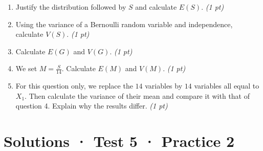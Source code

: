 \begin{enumerate}

\item Justify the distribution followed by $S$ and calculate $E(S)$. \hfill\textit{(1 pt)}

\item Using the variance of a Bernoulli random variable and independence, calculate $V(S)$. \hfill\textit{(1 pt)}

\item Calculate $E(G)$ and $V(G)$. \hfill\textit{(1 pt)}

\item We set $M=\frac S{14}$. Calculate $E(M)$ and $V(M)$. \hfill\textit{(1 pt)}

\item For this question only, we replace the $14$ variables by $14$ variables all equal to $X_1$. Then calculate the variance of their mean and compare it with that of question 4. Explain why the results differ. \hfill\textit{(1 pt)}

\end{enumerate}

\ifmxteacher\mxnewpage

\section*{Solutions · Test 5 · Practice 2}\label{cor:7-2}

